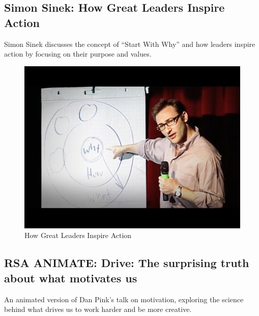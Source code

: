 \documentclass[
  letterpaper,
  DIV=11,
  numbers=noendperiod]{scrreprt}
\begin{document}
\subsection{Simon Sinek: How Great Leaders Inspire
Action}\label{simon-sinek-how-great-leaders-inspire-action}

Simon Sinek discusses the concept of ``Start With Why'' and how leaders
inspire action by focusing on their purpose and values.

\begin{figure}[H]

{\centering \includegraphics{index_files/mediabag/01.jpg}

}

\caption{How Great Leaders Inspire Action}

\end{figure}%

\subsection{RSA ANIMATE: Drive: The surprising truth about what
motivates
us}\label{rsa-animate-drive-the-surprising-truth-about-what-motivates-us}

An animated version of Dan Pink's talk on motivation, exploring the
science behind what drives us to work harder and be more creative.
\end{document}
